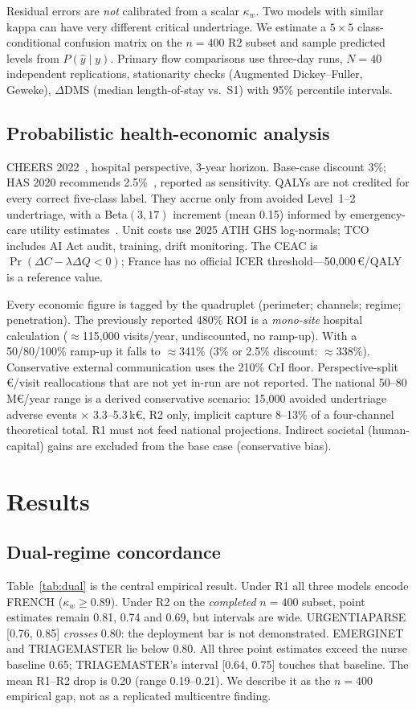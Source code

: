 \documentclass[conference]{IEEEtran}
\begin{document}
Residual errors are \emph{not} calibrated from a scalar $\kappa_w$. Two models with similar kappa can have very different critical undertriage. We estimate a $5\times5$ class-conditional confusion matrix on the $n=400$ R2 subset and sample predicted levels from $P(\hat{y}\mid y)$. Primary flow comparisons use three-day runs, $N=40$ independent replications, stationarity checks (Augmented Dickey--Fuller, Geweke), $\Delta$DMS (median length-of-stay vs.\ S1) with 95\% percentile intervals.

\subsection{Probabilistic health-economic analysis}
CHEERS 2022~\cite{husereau2022}, hospital perspective, 3-year horizon. Base-case discount 3\%; HAS 2020 recommends 2.5\%~\cite{has2020}, reported as sensitivity. QALYs are not credited for every correct five-class label. They accrue only from avoided Level~1--2 undertriage, with a Beta$(3,17)$ increment (mean 0.15) informed by emergency-care utility estimates~\cite{castillo2022}. Unit costs use 2025 ATIH GHS log-normals; TCO includes AI Act audit, training, drift monitoring. The CEAC is $\Pr(\Delta C-\lambda\Delta Q<0)$; France has no official ICER threshold---50{,}000\,€/QALY is a reference value.

Every economic figure is tagged by the quadruplet (perimeter; channels; regime; penetration). The previously reported 480\% ROI is a \emph{mono-site} hospital calculation ($\approx$115{,}000 visits/year, undiscounted, no ramp-up). With a 50/80/100\% ramp-up it falls to $\approx$341\% (3\% or 2.5\% discount: $\approx$338\%). Conservative external communication uses the 210\% CrI floor. Perspective-split €/visit reallocations that are not yet in-run are not reported. The national 50--80\,M€/year range is a derived conservative scenario: 15{,}000 avoided undertriage adverse events $\times$ 3.3--5.3\,k€, R2 only, implicit capture 8--13\% of a four-channel theoretical total. R1 must not feed national projections. Indirect societal (human-capital) gains are excluded from the base case (conservative bias).

\section{Results}

\subsection{Dual-regime concordance}
Table~\ref{tab:dual} is the central empirical result. Under R1 all three models encode FRENCH ($\kappa_w\geq0.89$). Under R2 on the \emph{completed} $n=400$ subset, point estimates remain 0.81, 0.74 and 0.69, but intervals are wide. URGENTIAPARSE [0.76, 0.85] \emph{crosses} 0.80: the deployment bar is not demonstrated. EMERGINET and TRIAGEMASTER lie below 0.80. All three point estimates exceed the nurse baseline 0.65; TRIAGEMASTER's interval [0.64, 0.75] touches that baseline. The mean R1--R2 drop is 0.20 (range 0.19--0.21). We describe it as the $n=400$ empirical gap, not as a replicated multicentre finding.
\end{document}
